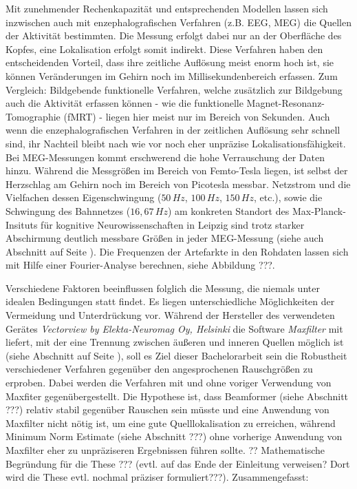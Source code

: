 \documentclass[doc,a4paper,12pt]{apa6}
\makeatletter
\DeclareRobustCommand*{\nameref}[1]{%
      \glqq{\myorg@nameref{#1}}\grqq%
    }%
\makeatother
\begin{document}
Mit zunehmender Rechenkapazität und entsprechenden Modellen lassen sich inzwischen auch mit enzephalografischen Verfahren (z.B. EEG, MEG) die Quellen der Aktivität bestimmten. Die Messung erfolgt dabei nur an der Oberfläche des Kopfes, eine Lokalisation erfolgt somit indirekt. Diese Verfahren haben den entscheidenden Vorteil, dass ihre zeitliche Auflösung meist enorm hoch ist, sie können Veränderungen im Gehirn noch im Millisekundenbereich erfassen. Zum Vergleich: Bildgebende funktionelle Verfahren, welche zusätzlich zur Bildgebung auch die Aktivität erfassen können - wie die funktionelle Magnet-Resonanz-Tomographie (fMRT) - liegen hier meist nur im Bereich von Sekunden. Auch wenn die enzephalografischen Verfahren in der zeitlichen Auflösung sehr schnell sind, ihr Nachteil bleibt nach wie vor noch eher unpräzise Lokalisationsfähigkeit. Bei MEG-Messungen kommt erschwerend die hohe Verrauschung der Daten hinzu. Während die Messgrößen im Bereich von Femto-Tesla liegen, ist selbst der Herzschlag am Gehirn noch im Bereich von Picotesla messbar. Netzstrom und die Vielfachen dessen Eigenschwingung ($50\,Hz$, $100\,Hz$, $150\,Hz$, etc.), sowie die Schwingung des Bahnnetzes ($16,67\,Hz$) am konkreten Standort des Max-Planck-Insituts für kognitive Neurowissenschaften in Leipzig sind trotz starker Abschirmung deutlich messbare Größen in jeder MEG-Messung (siehe auch Abschnitt \nameref{sec:rauschen} auf Seite \pageref{sec:rauschen}). Die Frequenzen der Artefarkte in den Rohdaten lassen sich mit Hilfe einer Fourier-Analyse berechnen, siehe Abbildung ???.

Verschiedene Faktoren beeinflussen folglich die Messung, die niemals unter idealen Bedingungen statt findet. Es liegen unterschiedliche Möglichkeiten der Vermeidung und Unterdrückung vor. Während der Hersteller des verwendeten Gerätes \emph{Vectorview by Elekta-Neuromag Oy, Helsinki} die Software \emph{Maxfilter} mit liefert, mit der eine Trennung zwischen äußeren und inneren Quellen möglich ist (siehe Abschnitt \nameref{sec:maxfilter} auf Seite \pageref{sec:maxfilter}), soll es Ziel dieser Bachelorarbeit sein die Robustheit verschiedener Verfahren gegenüber den angesprochenen Rauschgrößen zu erproben. Dabei werden die Verfahren mit und ohne voriger Verwendung von Maxfiter gegenübergestellt. Die Hypothese ist, dass Beamformer (siehe Abschnitt ???) relativ stabil gegenüber Rauschen sein müsste und eine Anwendung von Maxfilter nicht nötig ist, um eine gute Quelllokalisation zu erreichen, während Minimum Norm Estimate (siehe Abschnitt ???) ohne vorherige Anwendung von Maxfilter eher zu unpräziseren Ergebnissen führen sollte. ?? Mathematische Begründung für die These ??? (evtl. auf das Ende der Einleitung verweisen? Dort wird die These evtl. nochmal präziser formuliert???). Zusammengefasst:
\end{document}
